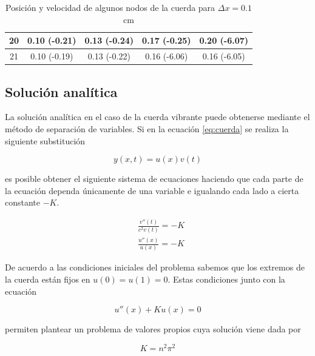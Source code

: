 \documentclass[11pt]{article}
\begin{document}
\begin{table}[t]
\begin{small}
\begin{tabular}{ c c c c c }
\hline
20 & 0.10 (-0.21) & 0.13 (-0.24) & 0.17 (-0.25) & 0.20 (-6.07) \\
\hline
21 & 0.10 (-0.19) & 0.13 (-0.22) & 0.16 (-6.06) & 0.16 (-6.05) \\
\end{tabular}
\end{small}
\caption{Posición y velocidad de algunos nodos de la cuerda para $\Delta{x} = 0.1$ cm }
\label{tab:est_velocidad}
\end{table}

\subsection{Solución analítica}
\label{sec:sol_analitica}
La solución analítica en el caso de la cuerda vibrante puede obtenerse mediante el método
de separación de variables. Si en la ecuación \eqref{eq:cuerda} se realiza la siguiente
substitución

\begin{equation}
y(x,t) = u(x)v(t)
\end{equation}

es posible obtener el siguiente sistema de ecuaciones haciendo que cada parte de la ecuación
dependa únicamente de una variable e igualando cada lado a cierta constante $-K$.

\begin{subequations}
\begin{flalign}
	&\frac{v''(t)}{c^2v(t)} = -K\\
	&\frac{u''(x)}{u(x)} = -K
\end{flalign}
\label{eq:sistema_cuerda}
\end{subequations}

De acuerdo a las condiciones iniciales del problema sabemos que los extremos de la cuerda
están fijos en $u(0) = u(1) = 0$. Estas condiciones junto con la ecuación

\begin{equation}
	u''(x) + Ku(x) = 0
\end{equation}

permiten plantear un problema de valores propios cuya solución viene dada por

\begin{equation}
	K = n^2\pi^2
\end{equation}
\end{document}
